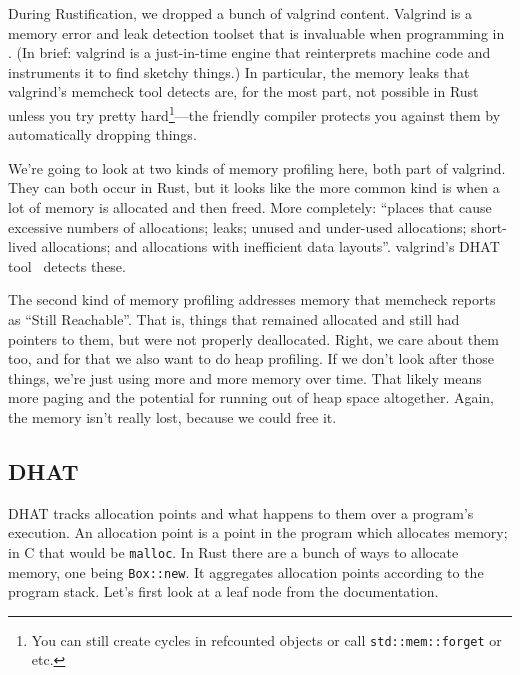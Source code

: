 During Rustification, we dropped a bunch of valgrind content. Valgrind is a memory error and leak detection toolset that is invaluable when programming in \CPP. (In brief: valgrind is a just-in-time engine that reinterprets machine code and instruments it to find sketchy things.) In particular, the memory leaks that valgrind's memcheck tool detects are, for the most part, not possible in Rust unless you try pretty hard\footnote{You can still create cycles in refcounted objects or call \texttt{std::mem::forget} or etc.}---the friendly compiler protects you against them by automatically dropping things.

We're going to look at two kinds of memory profiling here, both part of valgrind. They can both occur in Rust, but it looks like the more common kind is when a lot of memory is allocated and then freed. More completely: ``places that cause excessive numbers of allocations; leaks; unused and under-used allocations; short-lived allocations; and allocations with inefficient data layouts''. valgrind's DHAT tool~\cite[Chapter~10]{valgrind} detects these.

The second kind of memory profiling addresses memory that memcheck reports as ``Still Reachable''. That is, things that remained allocated and still had pointers to them, but were not properly deallocated. Right, we care about them too, and for that we also want to do heap profiling. If we don't look after those things, we're just using more and more memory over time. That likely means more paging and the potential for running out of heap space altogether. Again, the memory isn't really lost, because we could free it.

\subsection*{DHAT}
DHAT tracks allocation points and what happens to them over a program's execution. An allocation point is a point in the program which allocates memory; in C that would be \texttt{malloc}. In Rust there are a bunch of ways to allocate memory, one being \texttt{Box::new}. It aggregates allocation points according to the program stack. Let's first look at a leaf node from the documentation.

